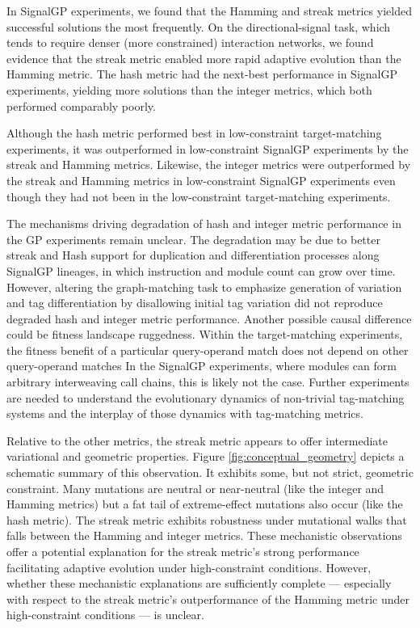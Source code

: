 In SignalGP experiments, we found that the Hamming and streak metrics yielded successful solutions the most frequently.
On the directional-signal task, which tends to require denser (more constrained) interaction networks, we found evidence that the streak metric enabled more rapid adaptive evolution than the Hamming metric.
The hash metric had the next-best performance in SignalGP experiments, yielding more solutions than the integer metrics, which both performed comparably poorly.

Although the hash metric performed best in low-constraint target-matching experiments, it was outperformed in low-constraint SignalGP experiments by the streak and Hamming metrics.
Likewise, the integer metrics were outperformed by the streak and Hamming metrics in low-constraint SignalGP experiments even though they had not been in the low-constraint target-matching experiments.

The mechanisms driving degradation of hash and integer metric performance in the GP experiments remain unclear.
The degradation may be due to better streak and Hash support for duplication and differentiation processes along SignalGP lineages, in which instruction and module count can grow over time.
However, altering the graph-matching task to emphasize generation of variation and tag differentiation by disallowing initial tag variation did not reproduce degraded hash and integer metric performance.
Another possible causal difference could be fitness landscape ruggedness.
Within the target-matching experiments, the fitness benefit of a particular query-operand match does not depend on other query-operand matches
In the SignalGP experiments, where modules can form arbitrary interweaving call chains, this is likely not the case.
Further experiments are needed to understand the evolutionary dynamics of non-trivial tag-matching systems and the interplay of those dynamics with tag-matching metrics.




Relative to the other metrics, the streak metric appears to offer intermediate variational and geometric properties.
Figure \ref{fig:conceptual_geometry} depicts a schematic summary of this observation.
It exhibits some, but not strict, geometric constraint.
Many mutations are neutral or near-neutral (like the integer and Hamming metrics) but a fat tail of extreme-effect mutations also occur (like the hash metric).
The streak metric exhibits robustness under mutational walks that falls between the Hamming and integer metrics.
These mechanistic observations offer a potential explanation for the streak metric's strong performance facilitating adaptive evolution under high-constraint conditions.
However, whether these mechanistic explanations are sufficiently complete --- especially with respect to the streak metric's outperformance of the Hamming metric under high-constraint conditions --- is unclear.

